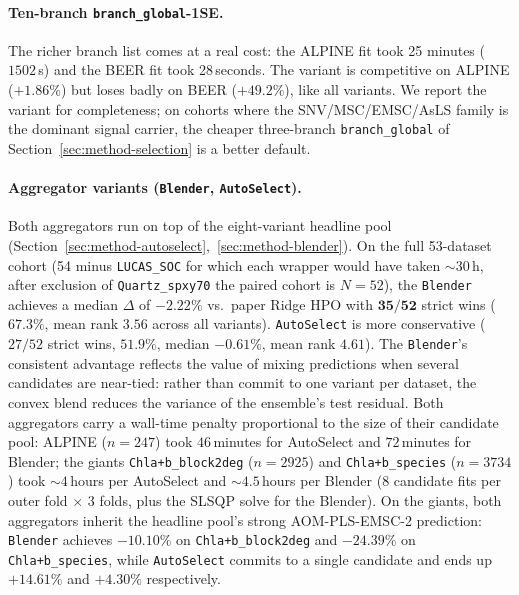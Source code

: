 \documentclass[11pt,a4paper]{article}
\begin{document}
\paragraph{Ten-branch \texttt{branch\_global}-1SE.}
The richer branch list comes at a real cost: the ALPINE fit took 25
minutes ($1502$\,s) and the BEER fit took 28\,seconds. The variant
is competitive on ALPINE ($+1.86\%$) but loses badly on BEER
($+49.2\%$), like all variants. We report the variant for
completeness; on cohorts where the SNV/MSC/EMSC/AsLS family is the
dominant signal carrier, the cheaper three-branch
\texttt{branch\_global} of Section~\ref{sec:method-selection} is a
better default.

\paragraph{Aggregator variants (\texttt{Blender}, \texttt{AutoSelect}).}
Both aggregators run on top of the eight-variant headline pool
(Section~\ref{sec:method-autoselect},~\ref{sec:method-blender}). On
the full 53-dataset cohort (54 minus \texttt{LUCAS\_SOC} for which
each wrapper would have taken $\sim 30$\,h, after exclusion of
\texttt{Quartz\_spxy70} the paired cohort is $N=52$), the
\texttt{Blender} achieves a median $\Delta$ of $\bm{-2.22\%}$ vs.\
paper Ridge HPO with $\bm{35/52}$ strict wins ($67.3\%$, mean rank
$3.56$ across all variants). \texttt{AutoSelect} is more
conservative ($27/52$ strict wins, $51.9\%$, median $-0.61\%$,
mean rank $4.61$). The \texttt{Blender}'s consistent advantage
reflects the value of mixing predictions when several candidates
are near-tied: rather than commit to one variant per dataset, the
convex blend reduces the variance of the ensemble's test residual.
Both aggregators carry a wall-time penalty proportional to the size
of their candidate pool: ALPINE ($n=247$) took $46$\,minutes for
AutoSelect and $72$\,minutes for Blender; the giants
\texttt{Chla+b\_block2deg} ($n=2925$) and \texttt{Chla+b\_species}
($n=3734$) took $\sim 4$\,hours per AutoSelect and $\sim 4.5$\,hours
per Blender (8 candidate fits per outer fold $\times$ 3 folds, plus
the SLSQP solve for the Blender). On the giants, both aggregators
inherit the headline pool's strong AOM-PLS-EMSC-2 prediction:
\texttt{Blender} achieves $-10.10\%$ on \texttt{Chla+b\_block2deg}
and $-24.39\%$ on \texttt{Chla+b\_species}, while
\texttt{AutoSelect} commits to a single candidate and ends up
$+14.61\%$ and $+4.30\%$ respectively.

\end{document}

